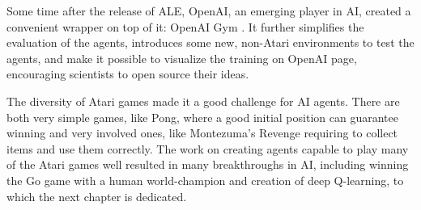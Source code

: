 Some time after the release of ALE, OpenAI, an emerging player in AI, created a convenient wrapper on top of it: OpenAI Gym \cite{gym}. It further simplifies the evaluation of the agents, introduces some new, non-Atari environments to test the agents, and make it possible to visualize the training on OpenAI page, encouraging scientists to open source their ideas.

The diversity of Atari games made it a good challenge for AI agents. There are both very simple games, like Pong, where a good initial position can guarantee winning and very involved ones, like Montezuma's Revenge  requiring to collect items and use them correctly. The work on creating agents capable to play many of the Atari games well resulted in many breakthroughs in AI, including winning the Go game with a human world-champion \cite{alphago} and creation of deep Q-learning, to which the next chapter is dedicated.
